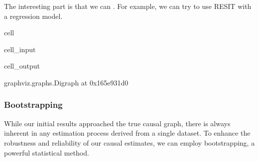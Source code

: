 \documentclass[letterpaper,10pt,english]{jupyterBook}
\begin{document}
\sphinxAtStartPar
The interesting part is that we can . For example, we can try to use RESIT with a  regression model.

\begin{sphinxuseclass}{cell}\begin{sphinxVerbatimInput}

\begin{sphinxuseclass}{cell_input}
\begin{sphinxVerbatim}[commandchars=\\\{\}]
 
   

    
  
 
\end{sphinxVerbatim}

\end{sphinxuseclass}\end{sphinxVerbatimInput}
\begin{sphinxVerbatimOutput}

\begin{sphinxuseclass}{cell_output}
\begin{sphinxVerbatim}[commandchars=\\\{\}]
\PYGZlt{}graphviz.graphs.Digraph at 0x165e931d0\PYGZgt{}
\end{sphinxVerbatim}

\end{sphinxuseclass}\end{sphinxVerbatimOutput}

\end{sphinxuseclass}

\subsubsection{Bootstrapping}
\label{\detokenize{notebooks/semiparametric_resit:bootstrapping}}
\sphinxAtStartPar
While our initial results approached the true causal graph, there is always inherent  in any estimation process derived from a single dataset. To enhance the robustness and reliability of our causal estimates, we can employ bootstrapping, a powerful statistical  method.
\end{document}
